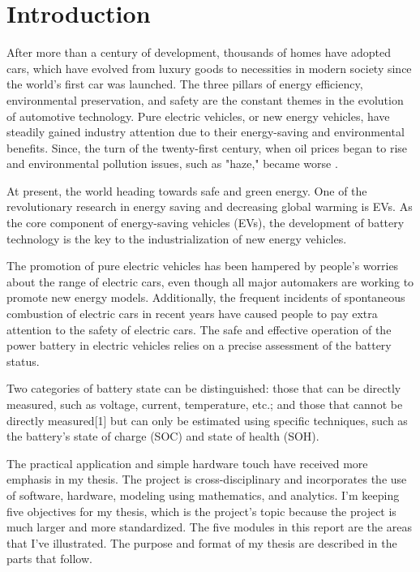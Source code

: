 \chapter*{Introduction}
After more than a century of development, thousands of homes have adopted cars, which have evolved from luxury goods to necessities in modern society since the world's first car was launched. The three pillars of energy efficiency, environmental preservation, and safety are the constant themes in the evolution of automotive technology. Pure electric vehicles, or new energy vehicles, have steadily gained industry attention due to their energy-saving and environmental benefits. Since, the turn of the twenty-first century, when oil prices began to rise and environmental pollution issues, such as "haze," became worse \cite{Real_Time_SOC_Estimation_Based_On_EKF_And_UKF_PTorin_Lei}.

At present, the world heading towards safe and green energy. One of the revolutionary research in energy saving and decreasing global warming is EVs. As the core component of energy-saving vehicles (EVs), the development of battery technology is the key to the industrialization of new energy vehicles. 

The promotion of pure electric vehicles has been hampered by people's worries about the range of electric cars, even though all major automakers are working to promote new energy models. Additionally, the frequent incidents of spontaneous combustion of electric cars in recent years have caused people to pay extra attention to the safety of electric cars. The safe and effective operation of the power battery in electric vehicles relies on a precise assessment of the battery status.

Two categories of battery state can be distinguished: those that can be directly measured, such as voltage, current, temperature, etc.; and those that cannot be directly measured[1] but can only be estimated using specific techniques, such as the battery's state of charge (SOC) and state of health (SOH).

The practical application and simple hardware touch have received more emphasis in my thesis. The project is cross-disciplinary and incorporates the use of software, hardware, modeling using mathematics, and analytics. I'm keeping five objectives for my thesis, which is the project's topic because the project is much larger and more standardized.
The five modules in this report are the areas that I've illustrated.
The purpose and format of my thesis are described in the parts that follow.

